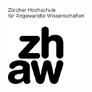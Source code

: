 

\begin{titlepage}

\setlength{\parskip}{0pt}

\begin{flushright}
\includegraphics[width=0.15\textwidth]{Figures/zhaw_sw}
\end{flushright}


\vspace{1cm}


\end{titlepage}
